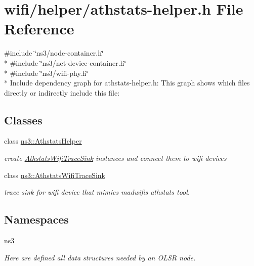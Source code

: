 \hypertarget{athstats-helper_8h}{}\section{wifi/helper/athstats-\/helper.h File Reference}
\label{athstats-helper_8h}
{\ttfamily \#include \char`\"{}ns3/node-\/container.\+h\char`\"{}}\\*
{\ttfamily \#include \char`\"{}ns3/net-\/device-\/container.\+h\char`\"{}}\\*
{\ttfamily \#include \char`\"{}ns3/wifi-\/phy.\+h\char`\"{}}\\*
Include dependency graph for athstats-\/helper.h\+:
This graph shows which files directly or indirectly include this file\+:
\subsection*{Classes}
\begin{DoxyCompactItemize}
\item 
class \hyperlink{classns3_1_1AthstatsHelper}{ns3\+::\+Athstats\+Helper}
\begin{DoxyCompactList}\small\item\em create \hyperlink{classns3_1_1AthstatsWifiTraceSink}{Athstats\+Wifi\+Trace\+Sink} instances and connect them to wifi devices \end{DoxyCompactList}\item 
class \hyperlink{classns3_1_1AthstatsWifiTraceSink}{ns3\+::\+Athstats\+Wifi\+Trace\+Sink}
\begin{DoxyCompactList}\small\item\em trace sink for wifi device that mimics madwifi\textquotesingle{}s athstats tool. \end{DoxyCompactList}\end{DoxyCompactItemize}
\subsection*{Namespaces}
\begin{DoxyCompactItemize}
\item 
 \hyperlink{namespacens3}{ns3}
\begin{DoxyCompactList}\small\item\em Here are defined all data structures needed by an O\+L\+SR node. \end{DoxyCompactList}\end{DoxyCompactItemize}
